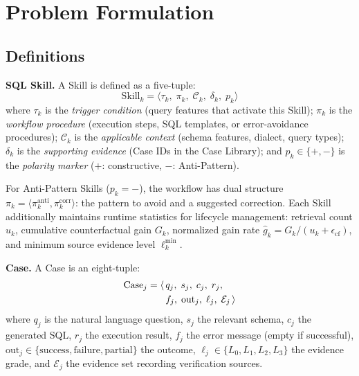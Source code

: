 
\section{Problem Formulation}
\label{sec:problem}

\subsection{Definitions}
\label{subsec:definitions}

\textbf{SQL Skill.} A Skill is defined as a five-tuple:
\begin{equation}
  \text{Skill}_k = \langle \tau_k,\; \pi_k,\; \mathcal{C}_k,\; \delta_k,\; p_k \rangle
  \label{eq:skill_def}
\end{equation}
where $\tau_k$ is the \emph{trigger condition} (query features that activate this Skill);
$\pi_k$ is the \emph{workflow procedure} (execution steps, SQL templates, or error-avoidance procedures);
$\mathcal{C}_k$ is the \emph{applicable context} (schema features, dialect, query types);
$\delta_k$ is the \emph{supporting evidence} (Case IDs in the Case Library);
and $p_k \in \{+, -\}$ is the \emph{polarity marker} ($+$: constructive, $-$: Anti-Pattern).

For Anti-Pattern Skills ($p_k = -$), the workflow has dual structure $\pi_k = \langle \pi_k^{\text{anti}}, \pi_k^{\text{corr}} \rangle$: the pattern to avoid and a suggested correction. Each Skill additionally maintains runtime statistics for lifecycle management: retrieval count $u_k$, cumulative counterfactual gain $G_k$, normalized gain rate $\hat{g}_k = G_k / (u_k + \epsilon_{\text{cf}})$, and minimum source evidence level $\ell_k^{\min}$.

\textbf{Case.} A Case is an eight-tuple:
\begin{align}
  \text{Case}_j = \langle\, &q_j,\; s_j,\; c_j,\; r_j, \notag \\
  &f_j,\; \text{out}_j,\; \ell_j,\; \mathcal{E}_j \,\rangle
  \label{eq:case_def}
\end{align}
where $q_j$ is the natural language question, $s_j$ the relevant schema, $c_j$ the generated SQL, $r_j$ the execution result, $f_j$ the error message (empty if successful), $\text{out}_j \in \{\text{success}, \text{failure}, \text{partial}\}$ the outcome, $\ell_j \in \{L_0, L_1, L_2, L_3\}$ the evidence grade, and $\mathcal{E}_j$ the evidence set recording verification sources.

